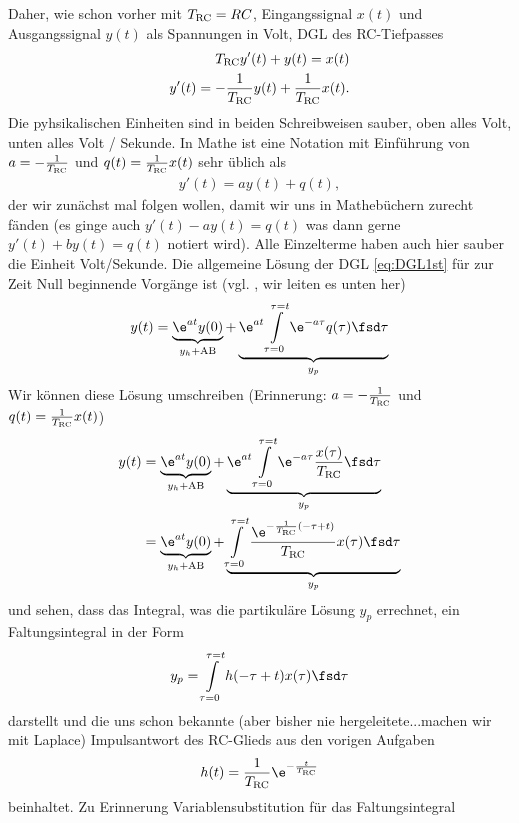 Daher, wie schon vorher mit $T_\text{RC}=R C$, Eingangssignal $x(t)$ und Ausgangssignal $y(t)$ als Spannungen in Volt, DGL des RC-Tiefpasses
\begin{align}
T_\text{RC} y'(t) + y(t) = x(t)\\
y'(t) = - \frac{1}{T_\text{RC}}y(t) + \frac{1}{T_\text{RC}} x(t).
\end{align}
Die pyhsikalischen Einheiten sind in beiden Schreibweisen sauber, oben alles Volt, unten alles Volt / Sekunde.
%
In Mathe ist eine Notation mit Einführung von $a = -\frac{1}{T_\text{RC}}$ und $q(t) = \frac{1}{T_\text{RC}} x(t)$ sehr üblich als
\begin{align}
\label{eq:DGL1st}
y'(t) = a y(t) + q(t),
\end{align}
der wir zunächst mal folgen wollen, damit wir uns in Mathebüchern zurecht fänden (es ginge auch $y'(t) -a y(t) =  q(t)$ was dann gerne $y'(t) + b y(t) =  q(t)$ notiert wird). Alle Einzelterme haben auch hier sauber die Einheit Volt/Sekunde.
%
Die allgemeine Lösung der DGL \eqref{eq:DGL1st} für zur Zeit Null beginnende Vorgänge ist (vgl. \cite[S.19, Glg. (4)]{Strang2014}, wir leiten es unten her)
\begin{align}
\label{eq:DGL1st_full_solution_with_conv}
y(t) = \underbrace{\e^{a t} y(0)}_{y_h+\text{AB}} + \underbrace{\e^{a t}\int\limits_{\tau=0}^{\tau=t} \e^{-a \tau} q(\tau) \fsd \tau}_{y_p}
\end{align}
Wir können diese Lösung umschreiben (Erinnerung: $a = -\frac{1}{T_\text{RC}}$ und $q(t) = \frac{1}{T_\text{RC}} x(t)$)
\begin{align}
y(t) &= \underbrace{\e^{a t} y(0)}_{y_h+\text{AB}} + \underbrace{\e^{a t}\int\limits_{\tau=0}^{\tau=t} \e^{-a \tau} \frac{x(\tau)}{\TRC} \fsd \tau}_{y_p}\\
&= \underbrace{\e^{a t} y(0)}_{y_h+\text{AB}} + \underbrace{\int\limits_{\tau=0}^{\tau=t} \frac{\e^{-\frac{1}{\TRC} (-\tau + t)}}{\TRC} x(\tau) \fsd \tau}_{y_p}
\end{align}
und sehen, dass das Integral, was die partikuläre Lösung $y_p$ errechnet, ein Faltungsintegral in der Form
\begin{align}
y_p = \int\limits_{\tau=0}^{\tau=t} h(-\tau+t) x(\tau) \fsd\tau
\end{align}
darstellt und die uns schon bekannte (aber bisher nie hergeleitete...machen wir mit Laplace) Impulsantwort des RC-Glieds aus den vorigen Aufgaben
\begin{align}
h(t) = \frac{1}{\TRC} \e^{-\frac{t}{\TRC}}
\end{align}
beinhaltet.
%
Zu Erinnerung Variablensubstitution für das Faltungsintegral
